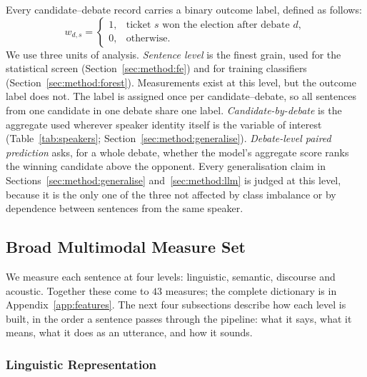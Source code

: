 \documentclass[pdflatex,sn-mathphys-num]{sn-jnl}%
\begin{document}
Every candidate--debate record carries a binary outcome label, defined as
follows:
\begin{equation}
w_{d,s} =
\begin{cases}
1, & \text{ticket } s\text{ won the election after debate } d, \\
0, & \text{otherwise.}
\end{cases}
\label{eq:outcome}
\end{equation}
We use three units of analysis. \emph{Sentence level} is the finest grain,
used for the statistical screen (Section~\ref{sec:method:fe}) and for
training classifiers (Section~\ref{sec:method:forest}). Measurements exist at
this level, but the outcome label does not. The label is assigned once per
candidate--debate, so all sentences from one candidate in one debate share
one label. \emph{Candidate-by-debate} is the aggregate used wherever speaker
identity itself is the variable of interest (Table~\ref{tab:speakers};
Section~\ref{sec:method:generalise}). \emph{Debate-level paired prediction}
asks, for a whole debate, whether the model's aggregate score ranks the
winning candidate above the opponent. Every generalisation claim in
Sections~\ref{sec:method:generalise} and~\ref{sec:method:llm} is judged at
this level, because it is the only one of the three not affected by class
imbalance or by dependence between sentences from the same speaker.

\subsection{Broad Multimodal Measure Set}
\label{sec:method:measures}

We measure each sentence at four levels: linguistic, semantic, discourse
and acoustic. Together these come to $43$ measures; the complete dictionary
is in Appendix~\ref{app:features}. The next four subsections describe how
each level is built, in the order a sentence passes through the pipeline:
what it says, what it means, what it does as an utterance, and how it
sounds.

\subsubsection{Linguistic Representation}
\label{sec:method:linguistic-rep}
\end{document}
